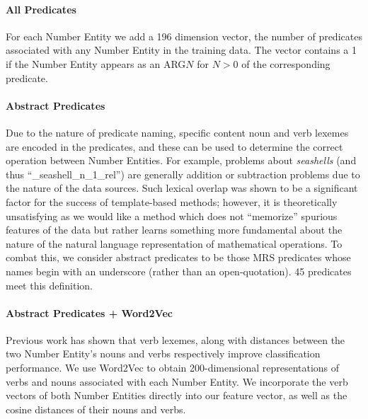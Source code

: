\paragraph{All Predicates} For each Number Entity we add a 196 dimension vector, the number of predicates associated with any Number Entity in the training data. The vector contains a 1 if the Number Entity appears as an ARG$N$ for $N>0$ of the corresponding predicate.  
\paragraph{Abstract Predicates}
 Due to the nature of predicate naming, specific content noun and verb lexemes are encoded in the predicates, and these can be used to determine the correct operation between Number Entities.
For example, problems about {\it seashells} (and thus ``\_seashell\_n\_1\_rel'') are generally addition or subtraction problems due to the nature of the data sources. 
Such lexical overlap was shown to be a significant factor for the success of template-based methods; however, it is theoretically unsatisfying as we would like a method which does not ``memorize'' spurious features of the data but rather learns something more fundamental about the nature of the natural language representation of mathematical operations.
To combat this, we consider abstract predicates to be those MRS predicates whose names begin with an underscore (rather than an open-quotation). 
45 predicates meet this definition. 
\paragraph{Abstract Predicates + Word2Vec} Previous work \cite{koncel2015parsing} has shown that verb lexemes, along with distances between the two Number Entity's nouns and verbs respectively improve classification performance. 
We use Word2Vec \cite{mikolov2013efficient} to obtain 200-dimensional representations of verbs and nouns associated with each Number Entity.
We incorporate the verb vectors of both Number Entities directly into our feature vector, as well as the cosine distances of their nouns and verbs.

